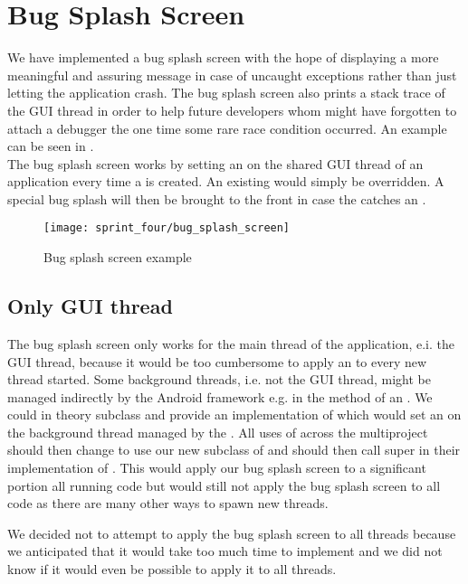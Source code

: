
\section{Bug Splash Screen}
\label{sec:bug_splash_screen}

We have implemented a bug splash screen with the hope of displaying a more meaningful and assuring message in case of uncaught exceptions rather than just letting the application crash. The bug splash screen also prints a stack trace of the GUI thread in order to help future developers whom might have forgotten to attach a debugger the one time some rare race condition occurred. An example can be seen in .\\

The bug splash screen works by setting an  on the shared GUI thread of an application every time a  is created. An existing  would simply be overridden. A special bug splash  will then be brought to the front in case the  catches an .

\begin{figure}[!htbp]
        \centering
        \texttt{[image: sprint\_four/bug\_splash\_screen]}
        \caption{Bug splash screen example}
        \label{fig:bug_splash_screen_example}
\end{figure}

\subsection{Only GUI thread} 
The bug splash screen only works for the main thread of the application, e.i. the GUI thread, because it would be too cumbersome to apply an  to every new thread started. Some background threads, i.e. not the GUI thread, might be managed indirectly by the Android framework e.g. in the  method of an . We could in theory subclass  and provide an implementation of  which would set an  on the background thread managed by the . All uses of  across the \giraf multiproject should then change to use our new subclass of  and should then call super in their implementation of . This would apply our bug splash screen to a significant portion all running code but would still not apply the bug splash screen to all code as there are many other ways to spawn new threads. 

We decided not to attempt to apply the bug splash screen to all threads because we anticipated that it would take too much time to implement and we did not know if it would even be possible to apply it to all threads.          

